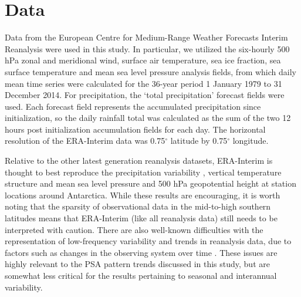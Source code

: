 \section{Data}

Data from the European Centre for Medium-Range Weather Forecasts Interim Reanalysis \citep[ERA-Interim;][]{Dee2011} were used in this study. In particular, we utilized the six-hourly 500 hPa zonal and meridional wind, surface air temperature, sea ice fraction, sea surface temperature and mean sea level pressure analysis fields, from which daily mean time series were calculated for the 36-year period 1 January 1979 to 31 December 2014. For precipitation, the `total precipitation' forecast fields were used. Each forecast field represents the accumulated precipitation since initialization, so the daily rainfall total was calculated as the sum of the two 12 hours post initialization accumulation fields for each day. The horizontal resolution of the ERA-Interim data was 0.75$^{\circ}$ latitude by 0.75$^{\circ}$ longitude.  

Relative to the other latest generation reanalysis datasets, ERA-Interim is thought to best reproduce the precipitation variability \citep{Bromwich2011,Nicolas2011}, vertical temperature structure \citep{Screen2012} and mean sea level pressure and 500 hPa geopotential height at station locations \citep{Bracegirdle2012} around Antarctica. While these results are encouraging, it is worth noting that the sparsity of observational data in the mid-to-high southern latitudes means that ERA-Interim (like all reanalysis data) still needs to be interpreted with caution. There are also well-known difficulties with the representation of low-frequency variability and trends in reanalysis data, due to factors such as changes in the observing system over time \citep{Dee2014}. These issues are highly relevant to the PSA pattern trends discussed in this study, but are somewhat less critical for the results pertaining to seasonal and interannual variability.
